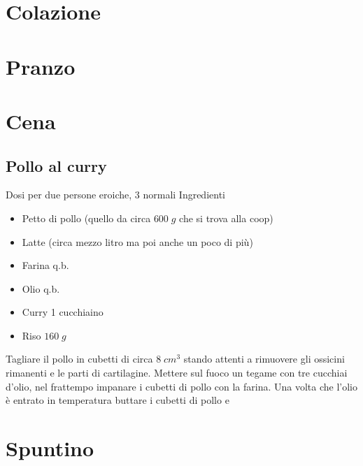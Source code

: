 
\chapter{Colazione}
\section{}
\chapter{Pranzo}

\chapter{Cena}
\section{Pollo al curry}
Dosi per due persone eroiche, 3 normali
Ingredienti
\begin{itemize}
\item Petto di pollo (quello da circa $600 \; g$ che si trova alla coop)
\item Latte (circa mezzo litro ma poi anche un poco di più)
\item Farina q.b.
\item Olio q.b.
\item Curry 1 cucchiaino
\item Riso $160 \; g$
\end{itemize}
Tagliare il pollo in cubetti di circa $8 \; cm^3$ stando attenti a rimuovere gli ossicini rimanenti e le parti di cartilagine. Mettere sul fuoco un tegame con tre cucchiai d'olio, nel frattempo impanare i cubetti di pollo con la farina. Una volta che l'olio è entrato in temperatura buttare i cubetti di pollo e

\chapter{Spuntino}

\pagebreak